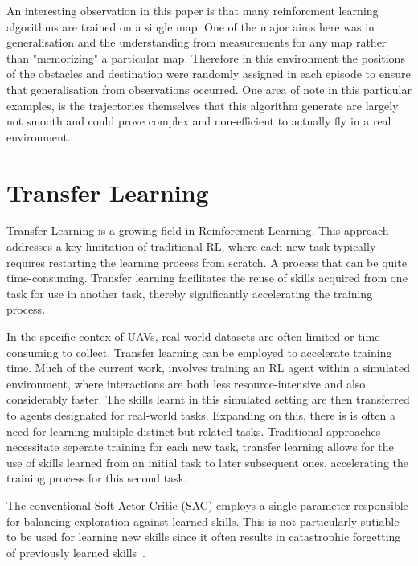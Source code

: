 An interesting observation in this paper is that many reinforcment learning algorithms are trained on a single map.
One of the major aims here was in generalisation and the understanding from measurements for any map rather than "memorizing" a particular map.
Therefore in this environment the positions of the obstacles and destination were randomly assigned in each episode to ensure that generalisation from observations occurred.
One area of note in this particular examples, is the trajectories themselves that this algorithm generate are largely not smooth and could prove complex and non-efficient to actually fly in a real environment.



\section{Transfer Learning}
Transfer Learning is a growing field in Reinforcment Learning.
This approach addresses a key limitation of traditional RL, where each new task typically requires restarting the learning process from scratch.
A process that can be quite time-consuming. 
Transfer learning facilitates the reuse of skills acquired from one task for use in another task, thereby significantly accelerating the training process.

In the specific contex of UAVs, real world datasets are often limited or time consuming to collect.
Transfer learning can be employed to accelerate training time.
Much of the current work, involves training an RL agent within a simulated environment, where interactions are both less resource-intensive and also considerably faster. 
The skills learnt in this simulated setting are then transferred to agents designated for real-world tasks.
Expanding on this, there is is often a need for learning multiple distinct but related tasks.
Traditional approaches necessitate seperate training for each new task, transfer learning allows for the use of skills learned from an initial task to later subsequent ones, accelerating the training process for this second task.

The conventional Soft Actor Critic (SAC) employs a single parameter responsible for balancing exploration against learned skills.
This is not particularly sutiable to be used for learning new skills since it often results in catastrophic forgetting of previously learned skills~\cite{fyp10-initial-transfer-learning}.

